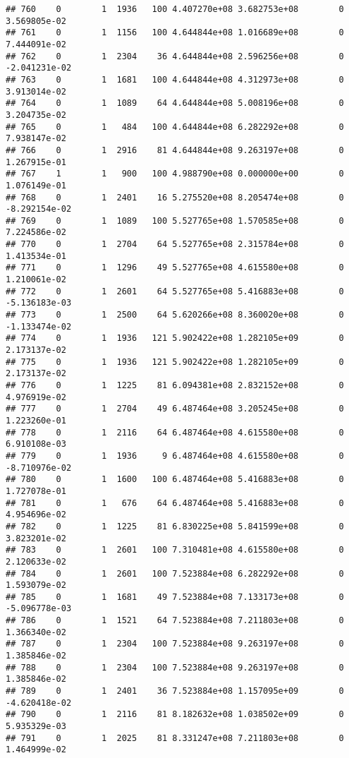 \documentclass[
]{article}
\begin{document}
\begin{enumerate}
\begin{verbatim}
## 760    0        1  1936   100 4.407270e+08 3.682753e+08        0  3.569805e-02
## 761    0        1  1156   100 4.644844e+08 1.016689e+08        0  7.444091e-02
## 762    0        1  2304    36 4.644844e+08 2.596256e+08        0 -2.041231e-02
## 763    0        1  1681   100 4.644844e+08 4.312973e+08        0  3.913014e-02
## 764    0        1  1089    64 4.644844e+08 5.008196e+08        0  3.204735e-02
## 765    0        1   484   100 4.644844e+08 6.282292e+08        0  7.938147e-02
## 766    0        1  2916    81 4.644844e+08 9.263197e+08        0  1.267915e-01
## 767    1        1   900   100 4.988790e+08 0.000000e+00        0  1.076149e-01
## 768    0        1  2401    16 5.275520e+08 8.205474e+08        0 -8.292154e-02
## 769    0        1  1089   100 5.527765e+08 1.570585e+08        0  7.224586e-02
## 770    0        1  2704    64 5.527765e+08 2.315784e+08        0  1.413534e-01
## 771    0        1  1296    49 5.527765e+08 4.615580e+08        0  1.210061e-02
## 772    0        1  2601    64 5.527765e+08 5.416883e+08        0 -5.136183e-03
## 773    0        1  2500    64 5.620266e+08 8.360020e+08        0 -1.133474e-02
## 774    0        1  1936   121 5.902422e+08 1.282105e+09        0  2.173137e-02
## 775    0        1  1936   121 5.902422e+08 1.282105e+09        0  2.173137e-02
## 776    0        1  1225    81 6.094381e+08 2.832152e+08        0  4.976919e-02
## 777    0        1  2704    49 6.487464e+08 3.205245e+08        0  1.223260e-01
## 778    0        1  2116    64 6.487464e+08 4.615580e+08        0  6.910108e-03
## 779    0        1  1936     9 6.487464e+08 4.615580e+08        0 -8.710976e-02
## 780    0        1  1600   100 6.487464e+08 5.416883e+08        0  1.727078e-01
## 781    0        1   676    64 6.487464e+08 5.416883e+08        0  4.954696e-02
## 782    0        1  1225    81 6.830225e+08 5.841599e+08        0  3.823201e-02
## 783    0        1  2601   100 7.310481e+08 4.615580e+08        0  2.120633e-02
## 784    0        1  2601   100 7.523884e+08 6.282292e+08        0  1.593079e-02
## 785    0        1  1681    49 7.523884e+08 7.133173e+08        0 -5.096778e-03
## 786    0        1  1521    64 7.523884e+08 7.211803e+08        0  1.366340e-02
## 787    0        1  2304   100 7.523884e+08 9.263197e+08        0  1.385846e-02
## 788    0        1  2304   100 7.523884e+08 9.263197e+08        0  1.385846e-02
## 789    0        1  2401    36 7.523884e+08 1.157095e+09        0 -4.620418e-02
## 790    0        1  2116    81 8.182632e+08 1.038502e+09        0  5.935329e-03
## 791    0        1  2025    81 8.331247e+08 7.211803e+08        0  1.464999e-02

\end{verbatim}
\end{enumerate}
\end{document}
